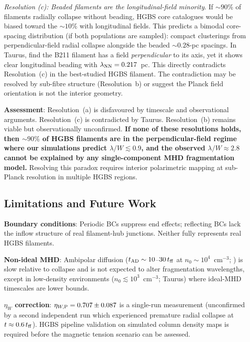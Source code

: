 \documentclass[twoside,twocolumn]{mnras}
\begin{document}
\textit{Resolution (c): Beaded filaments are the longitudinal-field minority}. If
${\sim}90\%$ of filaments radially collapse without beading, HGBS core catalogues would
be biased toward the ${\sim}10\%$ with longitudinal fields. This predicts a
bimodal core-spacing distribution (if both populations are sampled): compact clusterings
from perpendicular-field radial collapse alongside the beaded ${\sim}0.28$-pc
spacings. In Taurus, \citet{Palmeirim2013} find the B211 filament has a field
\textit{perpendicular} to its axis, yet it shows clear longitudinal beading with
$\lambda_{\rm NN} = 0.217$~pc. This directly contradicts Resolution~(c) in the
best-studied HGBS filament. The contradiction may be resolved by sub-fibre structure
(Resolution~b) or suggest the Planck field orientation is not the interior geometry.

\textbf{Assessment}: Resolution~(a) is disfavoured by timescale and observational
arguments. Resolution~(c) is contradicted by Taurus. Resolution~(b) remains viable
but observationally unconfirmed. \textbf{If none of these resolutions holds, then
${\sim}90\%$ of HGBS filaments are in the perpendicular-field regime where our
simulations predict $\lambda/W \lesssim 0.9$, and the observed $\lambda/W \approx 2.8$
cannot be explained by any single-component MHD fragmentation model.} Resolving this
paradox requires interior polarimetric mapping at sub-Planck resolution in multiple
HGBS regions.

\subsection{Limitations and Future Work}

\textbf{Boundary conditions}: Periodic BCs suppress end effects; reflecting BCs lack
the inflow structure of real filament-hub junctions. Neither fully represents real HGBS
filaments.

\textbf{Non-ideal MHD}: Ambipolar diffusion ($t_{\rm AD} \sim 10$--$30\,t_{\rm ff}$ at
$n_0 \sim 10^4$~cm$^{-3}$; \citealt{Mouschovias1991, Nakamura2005}) is slow relative
to collapse and is not expected to alter fragmentation wavelengths, except in
low-density environments ($n_0 \lesssim 10^3$~cm$^{-3}$; Taurus) where ideal-MHD
timescales are lower bounds.

\textbf{$\eta_W$ correction}: $\eta_{W,{\rm P}} = 0.707 \pm 0.087$ is a single-run measurement
(unconfirmed by a second independent run which experienced premature radial collapse
at $t \approx 0.6\,t_{\rm ff}$). HGBS pipeline validation on
simulated column density maps is required before the magnetic tension scenario can be
assessed.
\end{document}

